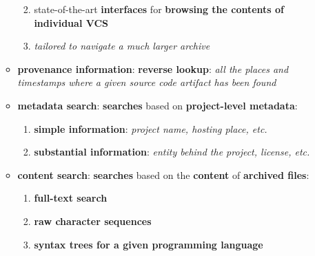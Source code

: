 \documentclass[11pt]{article}
\providecommand{\tightlist}{%
      \setlength{\itemsep}{0pt}\setlength{\parskip}{0pt}}
\begin{document}
\begin{enumerate}
\begin{itemize}
    \begin{enumerate}
    \def\labelenumii{\arabic{enumii}.}
    \tightlist
    \item
      state-of-the-art \textbf{interfaces} for \textbf{browsing the
      contents of individual VCS}
    \item
      \emph{tailored to navigate a much larger archive}
    \end{enumerate}
  \item
    \textbf{provenance information}: \textbf{reverse lookup}: \emph{all
    the places and timestamps where a given source code artifact has
    been found}
  \item
    \textbf{metadata search}: \textbf{searches} based on
    \textbf{project-level metadata}:

    \begin{enumerate}
    \def\labelenumii{\arabic{enumii}.}
    \tightlist
    \item
      \textbf{simple information}: \emph{project name, hosting place,
      etc.}
    \item
      \textbf{substantial information}: \emph{entity behind the project,
      license, etc.}
    \end{enumerate}
  \item
    \textbf{content search}: \textbf{searches} based on the
    \textbf{content} of \textbf{archived files}:

    \begin{enumerate}
    \def\labelenumii{\arabic{enumii}.}
    \tightlist
    \item
      \textbf{full-text search}
    \item
      \textbf{raw character sequences}
    \item
      \textbf{syntax trees for a given programming language}
    \end{enumerate}
  \end{itemize}
\end{enumerate}





    
\end{document}
